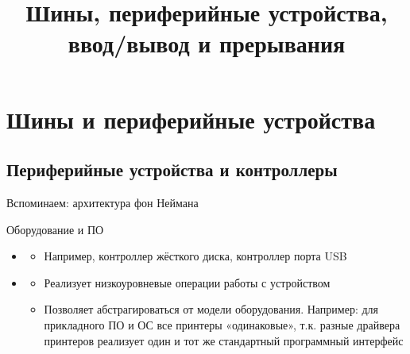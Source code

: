 \documentclass[xetex,aspectratio=43]{beamer}
\title[Шины и периферийные устройства]{Шины, периферийные устройства, ввод/вывод и прерывания}
\begin{document}
\titleslide

\tocslide

\section{Шины и периферийные устройства}

\subsection{Периферийные устройства и контроллеры}

\begin{frame}{Вспоминаем: архитектура фон Неймана}
	\begin{figure}
		
	\end{figure}
\end{frame}

\begin{frame}{Оборудование и ПО}
	\begin{itemize}
		\item

		\begin{itemize}
			\item
			Например, контроллер жёсткого диска, контроллер порта USB
		\end{itemize}
		\item

		\begin{itemize}
			\item
			Реализует низкоуровневые операции работы с устройством
			\item
			Позволяет абстрагироваться от модели оборудования.
			Например: для прикладного ПО и ОС все принтеры «одинаковые», т.к. разные драйвера принтеров реализует один и тот же стандартный программный интерфейс
		\end{itemize}
	\end{itemize}
\end{frame}
\end{document}
